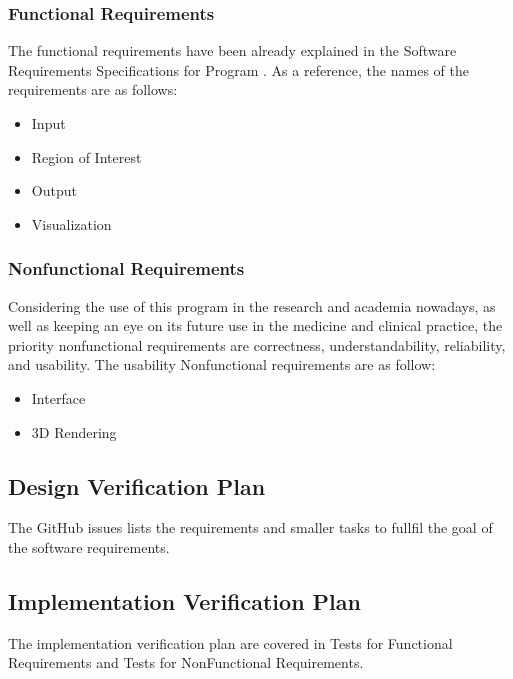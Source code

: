 \documentclass[12pt, titlepage]{article}
\begin{document}
\subsubsection{Functional Requirements}
The functional requirements have been already explained in the Software Requirements Specifications for Program \progname{}. As a reference, the names of the requirements are as follows:
\begin{itemize}
\item {Input}
\item {Region of Interest}
\item {Output}
\item {Visualization}
\end{itemize} 


\subsubsection{Nonfunctional Requirements}
Considering the use of this program in the research and academia nowadays, as well as keeping an eye on its future use in the medicine and clinical practice, the priority nonfunctional
requirements are correctness, understandability, reliability, and usability. The usability Nonfunctional requirements are as follow:
\begin{itemize}
\item {Interface}
\item {3D Rendering}
\end{itemize} 




\subsection{Design Verification Plan}

The GitHub issues lists the requirements and smaller tasks to fullfil the goal of the software requirements.
%
%

\subsection{Implementation Verification Plan}
The implementation verification plan are covered in Tests for Functional Requirements and Tests for NonFunctional Requirements.
\end{document}

